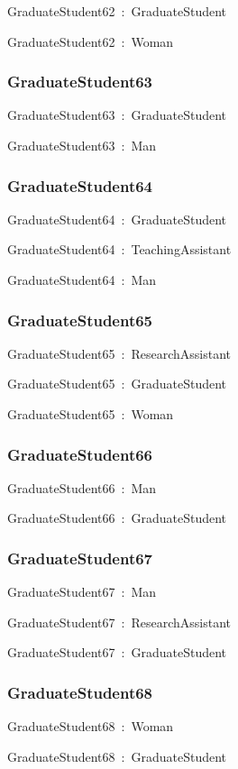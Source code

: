 \documentclass{article}
\begin{document}
GraduateStudent62~:~GraduateStudent

GraduateStudent62~:~Woman

\subsubsection*{GraduateStudent63}

GraduateStudent63~:~GraduateStudent

GraduateStudent63~:~Man

\subsubsection*{GraduateStudent64}

GraduateStudent64~:~GraduateStudent

GraduateStudent64~:~TeachingAssistant

GraduateStudent64~:~Man

\subsubsection*{GraduateStudent65}

GraduateStudent65~:~ResearchAssistant

GraduateStudent65~:~GraduateStudent

GraduateStudent65~:~Woman

\subsubsection*{GraduateStudent66}

GraduateStudent66~:~Man

GraduateStudent66~:~GraduateStudent

\subsubsection*{GraduateStudent67}

GraduateStudent67~:~Man

GraduateStudent67~:~ResearchAssistant

GraduateStudent67~:~GraduateStudent

\subsubsection*{GraduateStudent68}

GraduateStudent68~:~Woman

GraduateStudent68~:~GraduateStudent
\end{document}
